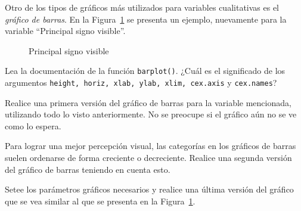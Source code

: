 \documentclass{prob}
\begin{document}
	\begin{problema}
	Otro de los tipos de gráficos más utilizados para variables cualitativas es el \textit{gráfico de barras}. En la Figura~\ref{fig:plot02} se presenta un ejemplo, nuevamente para la variable \textquotedblleft Principal signo visible\textquotedblright.\\
	
\begin{figure}[!ht]
    \centering
    
    \caption{Principal signo visible}
    \label{fig:plot02}
\end{figure}	
	
	\begin{parte}
		Lea la documentación de la función \texttt{barplot()}. ¿Cuál es el significado de los argumentos \texttt{height, horiz, xlab, ylab, xlim, cex.axis} y \texttt{cex.names}?
	\end{parte}	
	
	\begin{parte}
	Realice una primera versión del gráfico de barras para la variable mencionada, utilizando todo lo visto anteriormente. No se preocupe si el gráfico aún no se ve como lo espera.	
	\end{parte}
	
	\begin{parte}
	Para lograr una mejor percepción visual, las categorías en los gráficos de barras suelen ordenarse de forma creciente o decreciente. Realice una segunda versión del gráfico de barras teniendo en cuenta esto. \\
	
	\noindent{}	
	\end{parte}
	
	\begin{parte}
	Setee los parámetros gráficos necesarios y realice una última versión del gráfico que se vea similar al que se presenta en la Figura~\ref{fig:plot02}.
	\end{parte}	
	\end{problema}
	
\end{document}

